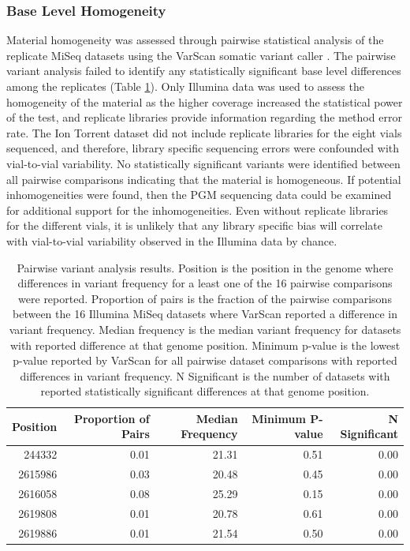 \documentclass[smallextended]{svjour3}\usepackage[]{graphicx}\usepackage[]{color}
\begin{document}
\subsubsection{Base Level Homogeneity}
Material homogeneity was assessed through pairwise statistical analysis of the replicate MiSeq datasets using the VarScan somatic variant caller \cite{Koboldt2009}. 
The pairwise variant analysis failed to identify any statistically significant base level differences among the replicates (Table \ref{Table:homogeneityTable}).
Only Illumina data was used to assess the homogeneity of the material as the higher coverage increased the statistical power of the test, and replicate libraries provide information regarding the method error rate. 
The Ion Torrent dataset did not include replicate libraries for the eight vials sequenced, and therefore, library specific sequencing errors were confounded with vial-to-vial variability. 
No statistically significant variants were identified between all pairwise comparisons indicating that the material is homogeneous. 
If potential inhomogeneities were found, then the PGM sequencing data could be examined for additional support for the inhomogeneities. 
Even without replicate libraries for the different vials, it is unlikely that any library specific bias will correlate with vial-to-vial variability observed in the Illumina data by chance.


\begin{table}[ht]
\centering
\begin{tabular}{rrrrr}
  \hline
Position & Proportion of Pairs & Median Frequency & Minimum P-value & N Significant \\ 
  \hline
244332 & 0.01 & 21.31 & 0.51 & 0.00 \\ 
  2615986 & 0.03 & 20.48 & 0.45 & 0.00 \\ 
  2616058 & 0.08 & 25.29 & 0.15 & 0.00 \\ 
  2619808 & 0.01 & 20.78 & 0.61 & 0.00 \\ 
  2619886 & 0.01 & 21.54 & 0.50 & 0.00 \\ 
   \hline
\end{tabular}
\caption{Pairwise variant analysis results. Position is the position in the genome where differences in variant frequency for a least one of the 16 pairwise comparisons were reported. Proportion of pairs is the fraction of the pairwise comparisons between the 16 Illumina MiSeq datasets where VarScan reported a difference in variant frequency. Median frequency is the median variant frequency for datasets with reported difference at that genome position. Minimum p-value is the lowest p-value reported by VarScan for all pairwise dataset comparisons with reported differences in variant frequency. N Significant is the number of datasets with reported statistically significant differences at that genome position.} 
\label{Table:homogeneityTable}
\end{table}
\end{document}
